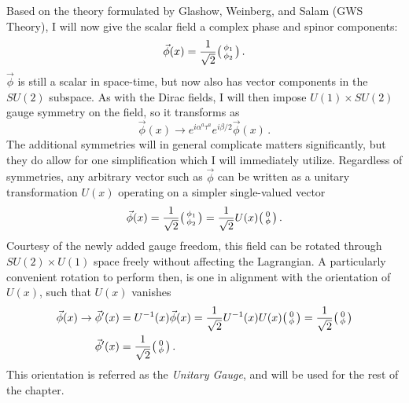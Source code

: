    Based on the theory formulated by Glashow, Weinberg, and Salam (GWS Theory)\cite{Glashow:1961tr}\cite{Goldstone:1962es},
        I will now give the scalar field a complex phase and spinor components:
    \begin{equation}
        \vec{\phi}(x) = \frac{1}{\sqrt{2}} \big(\begin{smallmatrix} \phi_1 \\ \phi_2 \end{smallmatrix}\big)
        \,.
    \end{equation}
    $\vec{\phi}$ is still a scalar in space-time, but now also has vector components in the $SU(2)$ subspace.
    As with the Dirac fields, I will then impose $U(1) \times SU(2)$ gauge symmetry on the field, so it transforms as
    \begin{equation}
        \vec{\phi}(x) \rightarrow e^{i \alpha^a \tau^a} e^{i \beta/2 } \vec{\phi}(x)
        \,.
    \end{equation}
    The additional symmetries will in general complicate matters significantly,
        but they do allow for one simplification which I will immediately utilize.
    Regardless of symmetries, any arbitrary vector such as $\vec{\phi}$ can be written as a unitary transformation $U(x)$ operating on a simpler single-valued vector
    \begin{equation}
        \vec{\phi}(x) = \frac{1}{\sqrt{2}} \big(\begin{smallmatrix} \phi_1 \\ \phi_2 \end{smallmatrix}\big) = \frac{1}{\sqrt{2}} U(x) \big(\begin{smallmatrix} 0 \\ \phi \end{smallmatrix}\big)
        \,.
    \end{equation}
    Courtesy of the newly added gauge freedom, this field can be rotated through $SU(2) \times U(1)$ space freely without affecting the Lagrangian.
    A particularly convenient rotation to perform then, is one in alignment with the orientation of $U(x)$, such that $U(x)$ vanishes
    \begin{equation} \begin{split}
        \vec{\phi}(x) \rightarrow \vec{\phi}'(x) 
            &= U^{-1}(x) \vec{\phi}(x)
            = \frac{1}{\sqrt{2}} U^{-1}(x) U(x) \big(\begin{smallmatrix} 0 \\ \phi \end{smallmatrix}\big)
            = \frac{1}{\sqrt{2}} \big(\begin{smallmatrix} 0 \\ \phi \end{smallmatrix}\big) \\
        \vec{\phi}'(x) &= \frac{1}{\sqrt{2}} \big(\begin{smallmatrix} 0 \\ \phi \end{smallmatrix}\big)
        \,.
    \end{split} \end{equation}
    This orientation is referred as the \textit{Unitary Gauge}, and will be used for the rest of the chapter.

